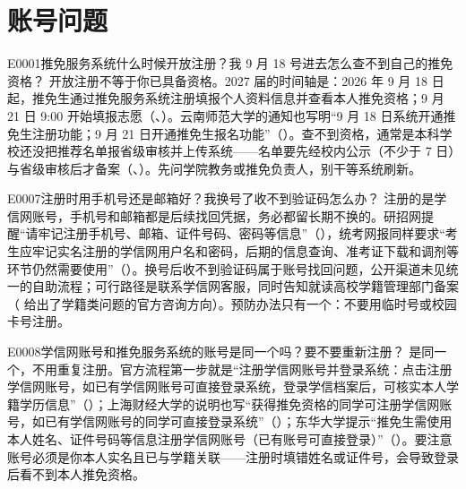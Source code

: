 \section{账号问题}
\begin{qa}{E0001}{推免服务系统什么时候开放注册？我 9 月 18 号进去怎么查不到自己的推免资格？}
开放注册不等于你已具备资格。2027 届的时间轴是：2026 年 9 月 18 日起，推免生通过推免服务系统注册填报个人资料信息并查看本人推免资格；9 月 21 日 9:00 开始填报志愿（、）。云南师范大学的通知也写明“9 月 18 日系统开通推免生注册功能；9 月 21 日开通推免生报名功能”（）。查不到资格，通常是本科学校还没把推荐名单报省级审核并上传系统——名单要先经校内公示（不少于 7 日）与省级审核后才备案（、）。先问学院教务或推免负责人，别干等系统刷新。
\end{qa}

\begin{qa}{E0007}{注册时用手机号还是邮箱好？我换号了收不到验证码怎么办？}
注册的是学信网账号，手机号和邮箱都是后续找回凭据，务必都留长期不换的。研招网提醒“请牢记注册手机号、邮箱、证件号码、密码等信息”（），统考网报同样要求“考生应牢记实名注册的学信网用户名和密码，后期的信息查询、准考证下载和调剂等环节仍然需要使用”（）。换号后收不到验证码属于账号找回问题，公开渠道未见统一的自助流程；可行路径是联系学信网客服，同时告知就读高校学籍管理部门备案（ 给出了学籍类问题的官方咨询方向）。预防办法只有一个：不要用临时号或校园卡号注册。
\end{qa}

\begin{qa}{E0008}{学信网账号和推免服务系统的账号是同一个吗？要不要重新注册？}
是同一个，不用重复注册。官方流程第一步就是“注册学信网账号并登录系统：点击注册学信网账号，如已有学信网账号可直接登录系统，登录学信档案后，可核实本人学籍学历信息”（）；上海财经大学的说明也写“获得推免资格的同学可注册学信网账号，如已有学信网账号的同学可直接登录系统”（）；东华大学提示“推免生需使用本人姓名、证件号码等信息注册学信网账号（已有账号可直接登录）”（）。要注意账号必须是你本人实名且已与学籍关联——注册时填错姓名或证件号，会导致登录后看不到本人推免资格。
\end{qa}

